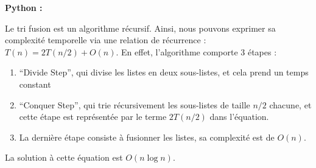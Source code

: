 \begin{Exercice} [30 minutes]
    \begin{solution}
        \textbf{Python :}
         
    \end{solution}
   
    \begin{solution}
        Le tri fusion est un algorithme récursif. Ainsi, nous pouvons exprimer sa complexité temporelle via une relation de récurrence : $T(n) = 2T(n/2) + O(n)$. En effet, l'algorithme comporte 3 étapes :
        \begin{enumerate}
            \item ``Divide Step'', qui divise les listes en deux sous-listes, et cela prend un temps constant
            \item ``Conquer Step'', qui trie récursivement les sous-listes de taille $n/2$ chacune, et cette étape est représentée par le terme $2T(n/2)$ dans l'équation.
            \item La dernière étape consiste à fusionner les listes, sa complexité est de $O(n)$.
        \end{enumerate}
        La solution à cette équation est $O(n \log n)$.
    \end{solution}
\end{Exercice}


